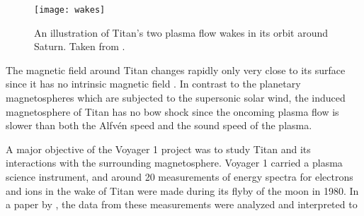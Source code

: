 \documentclass[12pt, parskip=full*, abstract]{scrartcl}
\begin{document}
\begin{figure}[htbp]
	\centering
	\texttt{[image: wakes]}
	\caption{An illustration of Titan's two plasma flow wakes in its orbit around Saturn. Taken from \textcite{ionosphere-magnetosphere-interaction-coates}.}
	\label{wakes}
\end{figure}





The magnetic field around Titan changes rapidly only very close to its surface since it has no intrinsic magnetic field \parencite{encyclopedia}. In contrast to the planetary magnetospheres which are subjected to the supersonic solar wind, the induced magnetosphere of Titan has no bow shock since the oncoming plasma flow is slower than both the Alfvén speed and the sound speed of the plasma. 

A major objective of the Voyager 1 project was to study Titan and its interactions with the surrounding magnetosphere. Voyager 1 carried a plasma science instrument, and around 20 measurements of energy spectra for electrons and ions in the wake of Titan were made during its flyby of the moon in 1980. In a paper by \textcite{hartle-1982}, the data from these measurements were analyzed and interpreted to 
\end{document}
